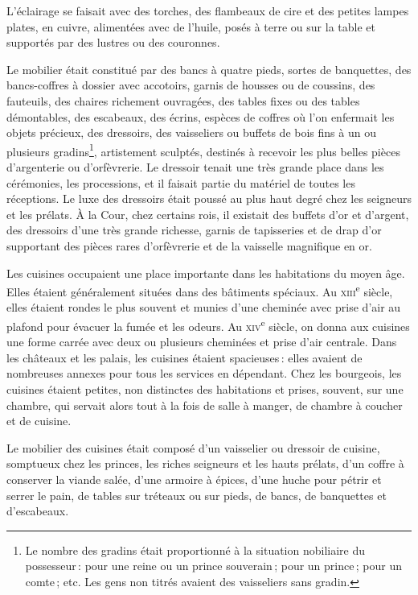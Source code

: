 L'éclairage se faisait avec des torches, des flambeaux de cire et des petites
lampes plates, en cuivre, alimentées avec de l'huile, posés à terre ou sur la
table et supportés par des lustres ou des couronnes.

Le mobilier était constitué par des bancs à quatre pieds, sortes de banquettes,
des bancs-coffres à dossier avec accotoirs, garnis de housses ou de coussins,
des fauteuils, des chaires richement ouvragées, des tables fixes ou des tables
démontables, des escabeaux, des écrins, espèces de coffres où l'on enfermait
les objets précieux, des dressoirs, des vaisseliers ou buffets de bois fins
à un ou plusieurs gradins\footnote{Le nombre des gradins était proportionné
à la situation nobiliaire du possesseur : {\mmm} pour une reine ou un
prince souverain ; {\mmm} pour un prince ; {\mmm} pour un comte ;
etc. Les gens non titrés avaient des vaisseliers sans gradin.}, artistement
sculptés, destinés à recevoir les plus belles pièces d'argenterie ou
d'orfèvrerie. Le dressoir tenait une très grande place dans les cérémonies, les
processions, et il faisait partie du matériel de toutes les réceptions. Le luxe
des dressoirs était poussé au plus haut degré chez les seigneurs et les
prélats. À la Cour, chez certains rois, il existait des buffets d'or et
d'argent, des dressoirs d'une très grande richesse, garnis de tapisseries et de
drap d’or supportant des pièces rares d'orfèvrerie et de la vaisselle
magnifique en or.

Les cuisines occupaient une place importante dans les habitations du moyen âge.
Elles étaient généralement situées dans des bâtiments spéciaux. Au
\textsc{xiii}\textsuperscript{e} siècle, elles étaient rondes le plus souvent
et munies d'une cheminée avec prise d'air au plafond pour évacuer la fumée et
les odeurs. Au \textsc{xiv}\textsuperscript{e} siècle, on donna aux cuisines
une forme carrée avec deux ou plusieurs cheminées et prise d'air centrale. Dans
les châteaux et les palais, les cuisines étaient spacieuses : elles avaient de
nombreuses annexes pour tous les services en dépendant. Chez les bourgeois, les
cuisines étaient petites, non distinctes des habitations et prises, souvent,
sur une chambre, qui servait alors tout à la fois de salle à manger, de chambre
à coucher et de cuisine.

Le mobilier des cuisines était composé d'un vaisselier ou dressoir de cuisine,
somptueux chez les princes, les riches seigneurs et les hauts prélats, d'un
coffre à conserver la viande salée, d'une armoire à épices, d'une huche pour
pétrir et serrer le pain, de tables sur tréteaux ou sur pieds, de bancs, de
banquettes et d'escabeaux.

